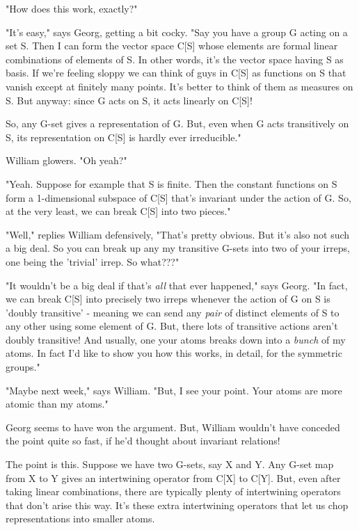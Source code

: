 "How does this work, exactly?" 

"It's easy," says Georg, getting a bit cocky.  "Say you
have a group G acting on a set S.  Then I can form the vector space
C[S] whose elements are formal linear combinations of elements of S.
In other words, it's the vector space having S as basis.  If we're
feeling sloppy we can think of guys in C[S] as functions on S that
vanish except at finitely many points.  It's better to think of them
as measures on S.  But anyway: since G acts on S, it acts linearly on
C[S]!

So, any G-set gives a representation of G.  But, even when G acts
transitively on S, its representation on C[S] is hardly ever irreducible."

William glowers.  "Oh yeah?"

"Yeah.  Suppose for example that S is finite.  Then the constant functions 
on S form a 1-dimensional subspace of C[S] that's invariant under the 
action of G.  So, at the very least, we can break C[S] into two pieces."

"Well," replies William defensively, "That's pretty obvious.  But it's
also not such a big deal.  So you can break up any my transitive G-sets 
into two of your irreps, one being the 'trivial' irrep.  So what???"

"It wouldn't be a big deal if that's \emph{all} that ever
happened," says Georg.  "In fact, we can break C[S] into
precisely two irreps whenever the action of G on S is 'doubly transitive'
- meaning we can send any \emph{pair} of distinct elements of S to any
other using some element of G.  But, there lots of transitive actions
aren't doubly transitive!  And usually, one your atoms breaks down
into a \emph{bunch} of my atoms.  In fact I'd like to show you how this
works, in detail, for the symmetric groups."

"Maybe next week," says William.  "But, I see your
point.  Your atoms are more atomic than my atoms."

Georg seems to have won the argument.  But, William wouldn't have 
conceded the point quite so fast, if he'd thought about invariant 
relations!

The point is this.  Suppose we have two G-sets, say X and Y.  Any 
G-set map from X to Y gives an intertwining operator from C[X] to C[Y].  
But, even after taking linear combinations, there are typically 
plenty of intertwining operators that don't arise this way.  It's
these extra intertwining operators that let us chop representations 
into smaller atoms.


